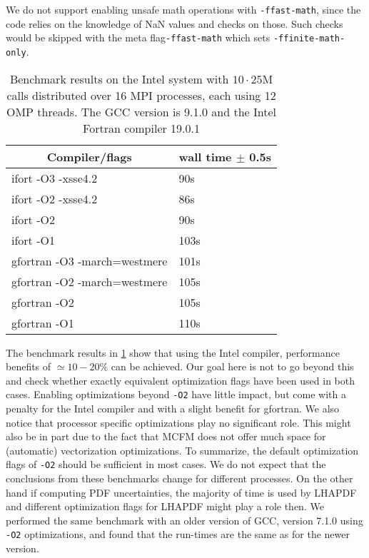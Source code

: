 We do not support enabling unsafe math operations with \texttt{-ffast-math}, since the code 
relies on the knowledge of NaN values and checks on those. Such checks would be skipped with the meta 
flag\texttt{-ffast-math} which sets \texttt{-ffinite-math-only}.


\begin{table}[]
	\centering
	\caption{Benchmark results on the Intel system with $10\cdot25$M calls distributed over 16 MPI processes, each 
	using 12 
	OMP 
	threads. The GCC version is 9.1.0 and the Intel Fortran compiler 19.0.1}
	\vspace{1em}
	\begin{tabular}{@{}ll@{}}
		\hline
		\multicolumn{1}{c}{\textbf{Compiler/flags}} & \multicolumn{1}{c}{\textbf{wall time $\pm$ 0.5s}} \\ \hline
		ifort -O3 -xsse4.2                          & 90s                                           \\
		ifort -O2 -xsse4.2                          & 86s                                           \\
		ifort -O2									& 90s											\\
		ifort -O1									& 103s 											\\
		gfortran -O3 -march=westmere                & 101s                                          \\ 
		gfortran -O2 -march=westmere		        & 105s											\\
		gfortran -O2								& 105s											\\
		gfortran -O1								& 110s											\\
		\hline
	\end{tabular}
	\label{tab:benchintel}
\end{table}

The benchmark results in \ref{tab:benchintel} show that using the Intel compiler, performance benefits of $\simeq 
10-20\%$ can be achieved. Our goal here is not to go beyond this and check
whether exactly equivalent optimization flags have been used in both cases. Enabling optimizations beyond \texttt{-O2} 
have little impact, but come with a penalty for the Intel compiler and with a slight benefit for gfortran. We also
notice that processor specific optimizations play no significant role. This might also be in part due to the fact
that MCFM does not offer much space for (automatic) vectorization optimizations. To summarize, the default 
optimization flags of 
\texttt{-O2} should be sufficient in most cases. We do not expect that the conclusions from these benchmarks
change for different processes. On the other hand if computing PDF uncertainties, the majority of time
is used by LHAPDF and different optimization flags for LHAPDF might play a role then.
We performed the same benchmark with an older version of GCC, version 7.1.0 using \texttt{-O2} optimizations, and found 
that the run-times are the same as for the newer version.


